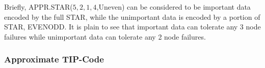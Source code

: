 \documentclass[sigconf]{acmart}
\begin{document}
Briefly, APPR.STAR($5,2,1,4$,Uneven) can be considered to be important data encoded by the full STAR, while the unimportant data is encoded by a portion of STAR, EVENODD. It is plain to see that important data can tolerate any 3 node failures while unimportant data can tolerate any 2 node failures.

\subsubsection{Approximate TIP-Code}

\begin{figure}[ht]
\centering
{}
\hspace{2pt}


\end{figure}
\end{document}
